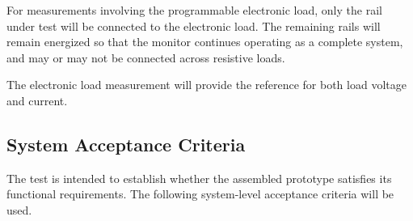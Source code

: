 For measurements involving the programmable electronic load, only the rail under
test will be connected to the electronic load. The remaining rails will remain
energized so that the monitor continues operating as a complete system, and may or may not be connected across resistive loads.

The electronic load measurement will provide the reference for both load voltage and current.

\subsection{System Acceptance Criteria}

The test is intended to establish whether the assembled prototype satisfies its
functional requirements. The following system-level acceptance criteria will be used.

